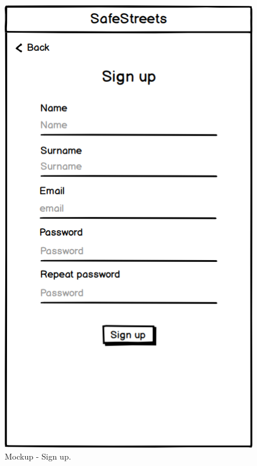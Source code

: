 \begin{figure}[H]
\begin{minipage}{.4\textwidth}
    \centering
    \includegraphics[width=.8\textwidth]{Images/sign-up.png}
    \caption{\label{fig:mockup-sign-up}Mockup - Sign up.}
\end{minipage}
\end{figure}

